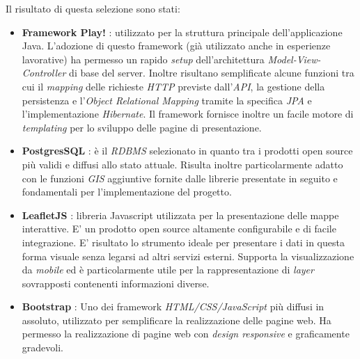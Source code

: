 Il risultato di questa selezione sono stati:
\begin{itemize}
\item \textbf{Framework Play!} \cite{playframework}: utilizzato per la struttura principale dell'applicazione Java. L'adozione di questo framework (già utilizzato anche in esperienze lavorative) ha permesso un rapido \emph{setup} dell'architettura \emph{Model-View-Controller} di base del server. Inoltre risultano semplificate alcune funzioni tra cui il \emph{mapping} delle richieste \emph{HTTP} previste dall'\emph{API}, la gestione della persistenza e l'\emph{Object Relational Mapping} tramite la specifica \emph{JPA} e l'implementazione \emph{Hibernate}. Il framework fornisce inoltre un facile motore di \emph{templating} per lo sviluppo delle pagine di presentazione.
\item \textbf{PostgresSQL} \cite{postgresql}: è il \emph{RDBMS} selezionato in quanto tra i prodotti open source più validi e diffusi allo stato attuale. Risulta inoltre particolarmente adatto con le funzioni \emph{GIS} aggiuntive fornite dalle librerie presentate in seguito e fondamentali per l'implementazione del progetto.
\item \textbf{LeafletJS} \cite{leafletjs}: libreria Javascript utilizzata per la presentazione delle mappe interattive. E' un prodotto open source altamente configurabile e di facile integrazione. E' risultato lo strumento ideale per presentare i dati in questa forma visuale senza legarsi ad altri servizi esterni. Supporta la visualizzazione da \emph{mobile} ed è particolarmente utile per la rappresentazione di \emph{layer} sovrapposti contenenti informazioni diverse.
\item \textbf{Bootstrap} \cite{bootstrap}: Uno dei framework \emph{HTML/CSS/JavaScript} più diffusi in assoluto, utilizzato per semplificare la realizzazione delle pagine web. Ha permesso la realizzazione di pagine web con \emph{design responsive} e graficamente gradevoli.
\end{itemize}
